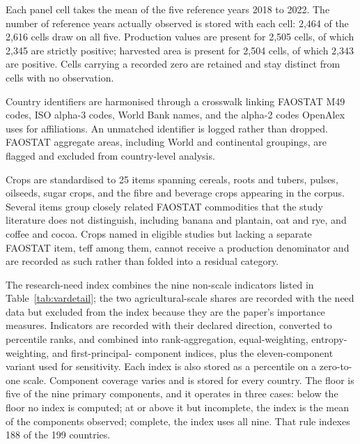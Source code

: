 \documentclass[ASNA,twocolumn]{USG}
\begin{document}
Each panel cell takes the mean of the five reference years 2018 to 2022. The number of reference
years actually observed is stored with each cell: 2,464 of the 2,616 cells draw on all five. Production values are present for 2,505 cells, of which 2,345 are strictly
positive; harvested area is present for 2,504 cells, of which 2,343 are positive. Cells
carrying a recorded zero are retained and stay distinct from cells with no observation.

Country identifiers are harmonised through a crosswalk linking FAOSTAT M49 codes, ISO
alpha-3 codes, World Bank names, and the alpha-2 codes OpenAlex uses for affiliations. An
unmatched identifier is logged rather than dropped. FAOSTAT aggregate areas, including World
and continental groupings, are flagged and excluded from country-level analysis.

Crops are standardised to 25 items spanning cereals, roots and tubers, pulses, oilseeds,
sugar crops, and the fibre and beverage crops appearing in the corpus. Several items group
closely related FAOSTAT commodities that the study literature does not distinguish, including
banana and plantain, oat and rye, and coffee and cocoa. Crops named in eligible studies but
lacking a separate FAOSTAT item, teff among them, cannot receive a production denominator and
are recorded as such rather than folded into a residual category.


The research-need index combines the nine non-scale indicators listed in
Table~\ref{tab:vardetail}; the two agricultural-scale shares are recorded with the need
data but excluded from the index because they are the paper's importance measures.
Indicators are recorded with their declared direction, converted to percentile ranks, and
combined into rank-aggregation, equal-weighting, entropy-weighting, and first-principal-
component indices, plus the eleven-component variant used for sensitivity. Each index is also stored as
a percentile on a zero-to-one scale. Component coverage varies and is stored for every country. The floor is five of the nine primary
components, and it operates in three cases: below the floor no index is computed; at or above it
but incomplete, the index is the mean of the components observed; complete, the index uses all
nine. That rule indexes 188 of the 199 countries.
\end{document}
